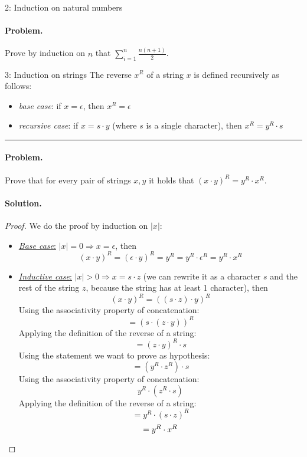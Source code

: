 \documentclass{article}
\begin{document}
			\begin{exercise}{ 2: Induction on natural numbers}
				\paragraph{Problem.}
				Prove by induction on $n$ that $\sum^n_{i=1} \frac{n(n+1)}{2}$.
			\end{exercise}
			\begin{exercise}{ 3: Induction on strings}
				The reverse $x^R$ of a string $x$ is defined recursively as follows:
    			\begin{itemize}[leftmargin=*]
        			\item \textit{base case}: if $x=\epsilon$, then $x^{R}=\epsilon$
        			\item \textit{recursive case}: if $x=s\cdot y$ (where $s$ is a single character), then $x^R=y^R\cdot s$
    			\end{itemize}
    			\noindent\rule{\linewidth}{0.6pt}\vspace{-0.3cm}
    			\paragraph{Problem.}
				Prove that for every pair of strings $x,y$ it holds that $(x\cdot y)^R=y^R \cdot x^R$.
				\paragraph{Solution.}
				\begin{proof}
					We do the proof by induction on $\left\lvert x\right\rvert$:
					\begin{itemize}
        				\item \uline{\textit{Base case}:} $|x|=0\Rightarrow x=\epsilon$, then 
            			$$(x \cdot y)^R=(\epsilon \cdot y)^R = y^R = y^R \cdot \epsilon^R = y^R \cdot x^R$$
        				\item \uline{\textit{Inductive case}:} $|x|>0\Rightarrow x=s \cdot z$ (we can rewrite it as a character $s$ and the rest of the string $z$, because the string has at least 1 character), then
            			$$(x \cdot y)^R=((s \cdot z) \cdot y)^R$$
            			Using the associativity property of concatenation:
            			$$=(s\cdot(z\cdot y))^R$$
            			Applying the definition of the reverse of a string:
            			$$=(z\cdot y)^R\cdot s$$
            			Using the statement we want to prove as hypothesis:
            			$$=(y^R \cdot z^R) \cdot s$$
            			Using the associativity property of concatenation:
            			$$y^R \cdot (z^R \cdot s)$$
            			Applying the definition of the reverse of a string:
            			$$=y^R \cdot (s \cdot z)^R$$
            			\begin{equation*}
							=y^R \cdot x^R \qedhere
						\end{equation*}
    				\end{itemize}
    			\end{proof}
			\end{exercise}
			
\end{document}
